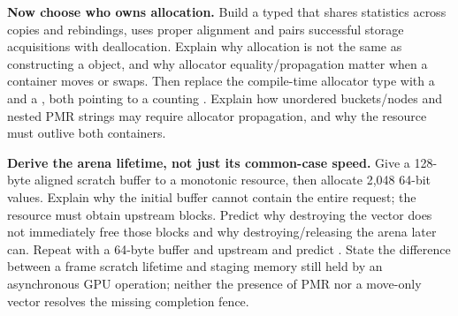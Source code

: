 \textbf{Now choose who owns allocation.} Build a typed  that shares statistics across copies and rebindings, uses proper alignment and pairs successful storage acquisitions with deallocation. Explain why allocation is not the same as constructing a  object, and why allocator equality/propagation matter when a container moves or swaps. Then replace the compile-time allocator type with a  and a , both pointing to a counting . Explain how unordered buckets/nodes and nested PMR strings may require allocator propagation, and why the resource must outlive both containers.

\textbf{Derive the arena lifetime, not just its common-case speed.} Give a 128-byte aligned scratch buffer to a monotonic resource, then allocate 2,048 64-bit values. Explain why the initial buffer cannot contain the entire request; the resource must obtain upstream blocks. Predict why destroying the vector does not immediately free those blocks and why destroying/releasing the arena later can. Repeat with a 64-byte buffer and  upstream and predict . State the difference between a frame scratch lifetime and staging memory still held by an asynchronous GPU operation; neither the presence of PMR nor a move-only vector resolves the missing completion fence.

